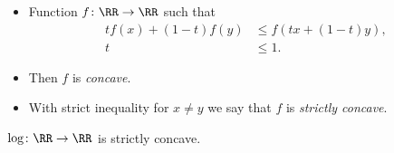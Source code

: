 \begin{frame}[fragile]
\end{frame}

\begin{frame}
  \begin{definition}
    \begin{itemize}
      \item Function \(f\colon \RR\to \RR\) such that
        \begin{align*}
          tf(x) + (1-t)f(y) &\leq f(tx + (1-t)y), \\
          t &\leq 1.
        \end{align*}

      \item Then \(f\) is \emph{concave}.
      \item With strict inequality for \(x\neq y\) we say that \(f\) is 
        \emph{strictly concave}.
    \end{itemize}
  \end{definition}
\end{frame}

\begin{frame}[fragile]
  \begin{example}
    \(\log\colon \RR\to \RR\) is strictly concave.
  \end{example}

\end{frame}

